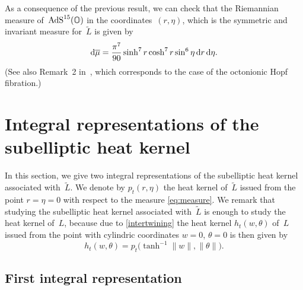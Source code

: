 \documentclass[pdftex]{sigma}
\numberwithin{equation}{section}
\begin{document}
\begin{Remark}As a consequence of the previous result, we can check that the Riemannian measure of~${\rm AdS}^{15}(\mathbb{O})$ in the coordinates~$(r,\eta)$, which is the symmetric and invariant measure for~$\tilde{L}$ is given by
\begin{equation}\label{eq:measure}
{\rm d}\overline{\mu}=\frac{{\pi}^7}{90}\sinh^7 r \cosh^7r\sin^6 \eta \, {\rm d}r \,{\rm d}\eta.
\end{equation}
(See also Remark~2 in~\cite{FBGC19}, which corresponds to the case of the octonionic Hopf fibration.)
\end{Remark}

\section{Integral representations of the subelliptic heat kernel}\label{section4}

In this section, we give two integral representations of the subelliptic heat kernel associated with~$\tilde{L}$. We denote by $p_t(r,\eta)$ the heat kernel of~$\tilde{L}$ issued from the point $r=\eta=0$ with respect to the measure \eqref{eq:measure}. We remark that studying the subelliptic heat kernel associated with~$\tilde{L}$ is enough to study the heat kernel of~$L$, because due to \eqref{intertwining} the heat kernel $h_t(w,\theta)$ of~$L$ issued from the point with cylindric coordinates $w=0$, $\theta=0$ is then given by
\[
h_t(w,\theta)=p_t\big( \tanh^{-1} \| w \|, \| \theta \|\big).
\]

\subsection{First integral representation}\label{section4.1}
\end{document}
